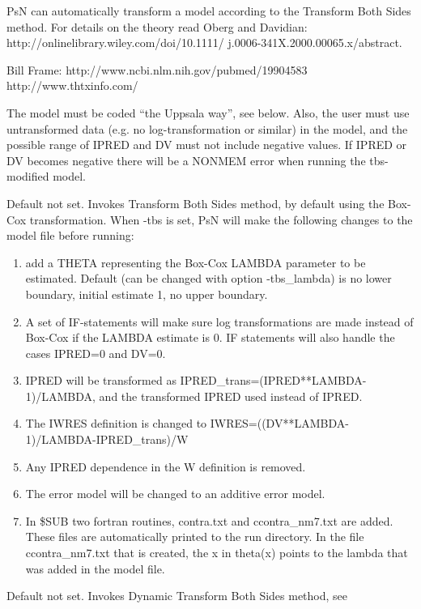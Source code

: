 PsN can automatically transform a model according to the 
Transform Both Sides method.
For details on the theory read Oberg and Davidian: \\
http://onlinelibrary.wiley.com/doi/10.1111/ j.0006-341X.2000.00065.x/abstract.

Bill Frame: http://www.ncbi.nlm.nih.gov/pubmed/19904583
 http://www.thtxinfo.com/
 
The model must be coded “the Uppsala way”, see below. 
Also, the user must use untransformed data (e.g. no log-transformation or similar) in the model, and the possible range of IPRED and DV must not include negative values. If IPRED or DV becomes negative there will be a NONMEM error when running the tbs-modified model. 



\begin{optionlist}
Default not set. Invokes Transform Both Sides method, by default using the Box-Cox transformation. 
When -tbs is set, PsN will make the following changes to the model file before running:
\begin{enumerate}
	\item add a THETA representing the Box-Cox LAMBDA parameter to be estimated. Default (can be changed with option -tbs\_lambda) is no lower boundary, initial estimate 1, no upper boundary.
	\item A set of IF-statements will make sure log transformations are made instead of Box-Cox if the LAMBDA estimate is 0. IF statements will also handle the cases IPRED=0 and DV=0.
	\item IPRED will be transformed as 
 IPRED\_trans=(IPRED**LAMBDA-1)/LAMBDA, 
 and the transformed  IPRED used instead of IPRED.  
	\item The IWRES definition is changed to 
 IWRES=((DV**LAMBDA-1)/LAMBDA-IPRED\_trans)/W
	\item Any IPRED dependence in the W definition is removed.
	\item The error model will be changed to an additive error model.
	\item In \$SUB two fortran routines, contra.txt and ccontra\_nm7.txt are added. These files are automatically printed to the run directory. In the file ccontra\_nm7.txt that is created, the x in theta(x) points to the lambda that was added in the model file.
\end{enumerate}
\nextopt
{}
Default not set. Invokes Dynamic Transform Both Sides method, see 
 

\end{optionlist}
